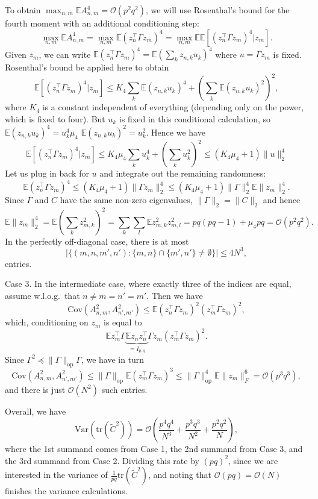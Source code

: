 \documentclass[12pt]{article}
\newcommand{\E}{\mathbb{E}}
\newcommand{\cov}{\mathrm{Cov}}
\newcommand{\op}{\mathrm{op}}
\begin{document}
To obtain $\max_{n,m} \E A_{n,m}^4 = \mathcal{O}(p^2q^2)$, we will use Rosenthal's bound \citep{rosenthal1970,merlevede2013rosenthal} for the fourth moment with an additional conditioning step:
\[
\max_{n,m} \E A_{n,m}^4 = \max_{n,m} \E (z_n^\top \Gamma z_m)^4 = \max_{n,m} \E \E[ (z_n^\top \Gamma z_m)^4|z_m].
\]
Given $z_m$, we can write $\E (z_n^\top \Gamma z_m)^4 = \E (\sum_k z_{n,k} u_k)^4$ where $u = \Gamma z_m$ is fixed. Rosenthal's bound be applied here to obtain
\[
\E[ (z_n^\top \Gamma z_m)^4|z_m] \leq K_4 \sum_{k} \E(z_{n,k} u_k)^4 + \left( \sum_k \E(z_{n,k} u_k)^2 \right)^2,
\]
where $K_4$ is a constant independent of everything (depending only on the power, which is fixed to four). But $u_k$ is fixed in this conditional calculation, so $\E(z_{n,k} u_k)^4=u_k^4 \mu_4$ $\E(z_{n,k} u_k)^2 = u_k^2$. Hence we have
\[
\E[ (z_n^\top \Gamma z_m)^4|z_m] \leq K_4 \mu_4 \sum_{k} u_k^4 + (\sum_k u_k^2)^2 \leq (K_4 \mu_4 + 1) \|u\|_2^4
\]
Let us plug in back for $u$ and integrate out the remaining randomness:
\[
\E (z_n^\top \Gamma z_m)^4 \leq (K_4 \mu_4 + 1) \|\Gamma z_m\|_2^4 \leq (K_4 \mu_4 + 1) \|\Gamma\|_2^4 \E \|z_m\|_2^4.
\]
Since $\Gamma$ and $C$ have the same non-zero eigenvalues, $\|\Gamma\|_2=\|C\|_2$ and hence
\[
\E \|z_m\|_2^4= \E (\sum_k z_{m,k}^2)^2=\sum_k\sum_l\E z_{m,k}^2 z_{m,l}^2=pq(pq-1)+\mu_4pq=\mathcal{O}(p^2q^2).
\]
In the perfectly off-diagonal case, there is at most
\[
\Big|\Big\{(m,n,m',n'): \{m,n\} \cap \{m',n'\} \neq \emptyset\Big\}\Big| \leq 4 N^3,
\]
entries.

Case 3. In the intermediate case, where exactly three of the indices are equal, assume w.l.o.g.~that $n\neq m=n'=m'$. Then we have
\[
\cov(A_{n,m}^2,A_{n',m'}^2) \leq \E (z_n^\top \Gamma z_m)^2(z_m^\top \Gamma z_m)^2,
\]
which, conditioning on $z_m$ is equal to
\[
\E z_m^\top \Gamma \underbrace{\E z_n z_n^\top}_{=I_{p,q}} \Gamma z_m (z_m^\top \Gamma z_m)^2.
\]
Since $\Gamma^2 \preceq \|\Gamma\|_\op \Gamma$, we have in turn
\[
\cov(A_{n,m}^2,A_{n',m'}^2) \leq \|\Gamma\|_\op \E (z_m^\top \Gamma z_m)^3 \leq \|\Gamma\|_\op^4 \E \|z_m\|_F^6 = \mathcal{O}(p^3q^3),
\]
and there is just $\mathcal{O}(N^2)$ such entries.

Overall, we have
\[
\mathrm{Var}(\mathrm{tr}(\widetilde C^2)) = \mathcal{O}\left(\frac{p^4q^4}{N^3} + \frac{p^3q^3}{N^2} + \frac{p^2q^2}{N}\right),
\]
where the 1st summand comes from Case 1, the 2nd summand from Case 3, and the 3rd summand from Case 2. Dividing this rate by $(pq)^2$, since we are interested in the variance of $\frac{1}{pq}\mathrm{tr}(\widetilde C^2)$, and noting that $\mathcal{O}(pq)=\mathcal{O}(N)$
finishes the variance calculations.
\end{document}
